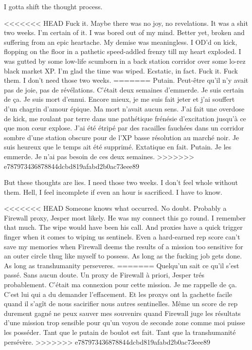 I gotta shift the thought process. 

<<<<<<< HEAD
Fuck it. Maybe there was no joy, no revelations. It was a shit two weeks. I'm certain of it. I was bored out of my mind. Better yet, broken and suffering from an epic heartache. My demise was meaningless. I OD'd on kick, flopping on the floor in a pathetic speed-addled frenzy till my heart exploded. I was gutted by some low-life scumborn in a back station corridor over some lo-rez black market XP. I'm glad the time was wiped. Ecstatic, in fact. Fuck it. Fuck them. I don't need those two weeks. 
=======
Putain. Peut-être qu'il n'y avait pas de joie, pas de révélations. C'était deux semaines d'emmerde. Je suis certain de ça. Je suis mort d'ennui. Encore mieux, je me suis fait jeter et j'ai souffert d'un chagrin d'amour épique. Ma mort n'avait aucun sens. J'ai fait une overdose de kick, me roulant par terre dans une pathétique frénésie d'excitation jusqu'à ce que mon cœur explose. J'ai été étripé par des racailles fauchées dans un corridor sombre d'une station obscure pour de l'XP basse résolution au marché noir. Je suis heureux que le temps ait été supprimé. Extatique en fait. Putain. Je les emmerde. Je n'ai pas besoin de ces deux semaines. 
>>>>>>> e787973436878844dcbd819afabd2b0ac73eee89

But these thoughts are lies. I need those two weeks. I don't feel whole without them. Hell, I feel incomplete if even an hour is sacrificed. I have to know. 

<<<<<<< HEAD
Someone knows what occurred. No doubt. Probably a Firewall proxy, Jesper most likely. He was my connect this go round. I remember that much. The wipe would have been his call. And proxies have a quick trigger finger when it comes to wiping us sentinels. Even a hard-earned rep score can't save my memories when Firewall deems the results of a mission too sensitive for an outer circle thug like myself to possess. As long as the fucking job gets done. As long as transhumanity perseveres. 
=======
Quelqu'un sait ce qu'il s'est passé. Sans aucun doute. Un proxy de Firewall à priori, Jesper trés probablement. C'était ma connexion pour cette mission. Je me rappelle de ça. C'est lui qui a du demander l'effacement. Et les proxys ont la gachette facile quand il s'agît de nous sacirifier nous autres sentinelles. Même un score de rep durement gagné ne peux sauver mes souvenirs quand Firewall juge les résultats d'une mission trop sensible pour qu'un voyou de seconde zone comme moi puisse les posséder. Tant que le putain de boulot est fait. Tant que la transhumanité persévère. 
>>>>>>> e787973436878844dcbd819afabd2b0ac73eee89

